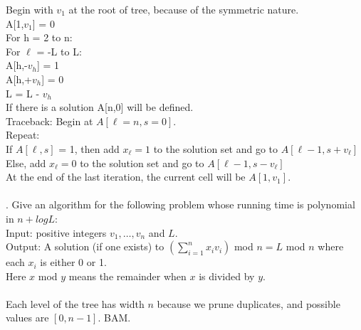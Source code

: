 \documentclass[10pt]{article}
\newcommand{\tab}{\hspace*{2em}}
\newcommand{\tabb}{\hspace*{4em}}
\begin{document}
			Begin with $v_1$ at the root of tree, because of the symmetric nature.\\
			A[1,$v_1$] = 0\\
			
		 	For h = 2 to n:\\
			\tab For $\ell$ = -L to L:\\
			\tabb A[h,\ell-$v_h$] = 1\\
			\tabb A[h,\ell+$v_h$] = 0\\
			\tabb L = L - $v_h$\\
			
			If there is a solution A[n,0] will be defined.\\
			Traceback: Begin at $A[\ell=n, s=0]$.\\
			Repeat:\\
				\tab If $A[\ell,s]$ = 1, then add $x_{\ell} = 1$ to the solution set and go to $A[\ell-1,s+v_{\ell}]$\\
				\tab Else, add $x_{\ell} = 0$ to the solution set and go to $A[\ell-1,s-v_{\ell}]$\\
			At the end of the last iteration, the current cell will be $A[1,v_1]$.\\
			\\ 
	.	Give an algorithm for the following problem whose running time is polynomial in $n + log L$:\\
			Input: positive integers $v_1, \ldots , v_n$ and $L$.\\
			Output:  A solution (if one exists) to $(\sum_{i=1}^n x_i v_i)$ mod $n = L$ mod $n$ where each $x_i$ is either 0 or 1.\\
			Here $x$ mod $y$ means the remainder when $x$ is divided by $y$.\\
	\\
	
	Each level of the tree has width $n$ because we prune duplicates, and possible values are $[0,n-1]$. BAM.\\
\end{document}
